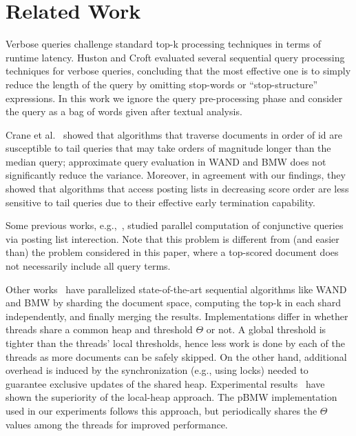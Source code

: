 \section{Related Work}
\label{sec:related}

Verbose queries challenge standard top-k processing techniques in terms of runtime latency. Huston and Croft \cite{Huston:2010} evaluated several sequential query processing techniques for verbose queries, concluding that the most effective one is to simply reduce the length of the query by omitting stop-words or ``stop-structure'' expressions. 
In this work we ignore the query pre-processing phase and consider the query as a bag of words given after textual analysis.

Crane et al.~\cite{Crane:2017} showed that  algorithms that traverse documents in order of id 
are susceptible to tail queries that may take orders of magnitude longer than the median query; approximate query evaluation in WAND and BMW does not significantly reduce the variance. Moreover, in agreement with our findings, they showed that algorithms that access  posting lists in decreasing score order are less sensitive to tail queries due to their effective early termination capability. 

Some previous works,  e.g.,~\cite{Tatikonda:2011,Liu:2018:GUC:3178487.3178512}, studied parallel computation  of conjunctive queries  via posting list interection. 
Note that this problem is different from (and easier than) the problem considered in this paper, where a top-scored document does not necessarily include all query terms. 

Other works~\cite{Bonacic:2010,rojas2013efficient} have parallelized state-of-the-art sequential algorithms like WAND and BMW  by sharding the document space, computing the top-k in each shard independently, and finally merging the results.  Implementations differ in whether threads share a common  
heap and  threshold $\Theta$ or not. A global threshold is  tighter than the threads' local thresholds, hence  less work is done by each of the threads as  more documents can be safely skipped. 
On the other hand, additional overhead is induced by the synchronization (e.g., using locks) needed to guarantee exclusive updates of the shared heap. 
Experimental results~\cite{rojas2013efficient} have shown the superiority of the local-heap approach. The pBMW implementation used in our experiments follows this approach,
but periodically shares the  $\Theta$ values among the threads for improved performance.

